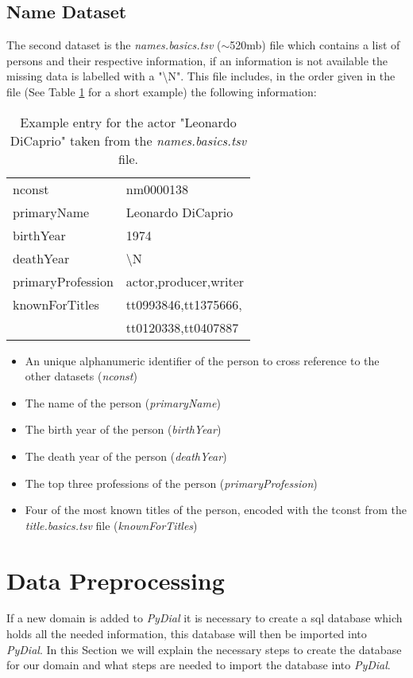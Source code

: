 \documentclass[11pt,a4paper]{article}
\begin{document}
	
	
	\subsection{Name Dataset}
	The second dataset is the \emph{names.basics.tsv} ($\sim$520mb) file which contains a list of persons and their respective information, if an information is not available the missing data is labelled with a "\textbackslash N". This file includes, in the order given in the file (See Table \ref{tab:names} for a short example) the following information:	
	\begin{table}[H]
	\centering
		\begin{tabular}{ll}
			\toprule[0.5mm]
			nconst & nm0000138 \\[0.7mm]
			primaryName & Leonardo DiCaprio \\[0.7mm]
			birthYear & 1974 \\[0.7mm]
			deathYear & \textbackslash N \\[0.7mm]
			primaryProfession & actor,producer,writer \\
			knownForTitles & tt0993846,tt1375666,\\[0.7mm]
			& tt0120338,tt0407887 \\[0.7mm]
			\bottomrule[0.5mm]
		\end{tabular}
		\caption{Example entry for the actor "Leonardo DiCaprio" taken from the \emph{names.basics.tsv} file.}
		\label{tab:names}
	\end{table}

	\begin{itemize}
		\item An unique alphanumeric identifier of the person to cross reference to the other datasets (\emph{nconst})
		\item The name of the person (\emph{primaryName})
		\item The birth year of the person (\emph{birthYear})
		\item The death year of the person (\emph{deathYear})
		\item The top three professions of the person (\emph{primaryProfession})
		\item Four of the most known titles of the person, encoded with the tconst from the \emph{title.basics.tsv} file (\emph{knownForTitles})
	\end{itemize}
	
	
\section{Data Preprocessing}
If a new domain is added to \emph{PyDial} it is necessary to create a sql database which holds all the needed information, this database will then be imported into \emph{PyDial}. In this Section we will explain the necessary steps to create the database for our domain and what steps are needed to import the database into \emph{PyDial}.
\end{document}
